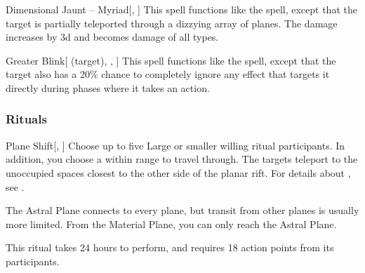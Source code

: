 \lowercase{\hypertarget{spell:Dimensional Jaunt -- Myriad}{}}\label{spell:Dimensional Jaunt -- Myriad}
\begin{apability}[\nth{6}]{\hypertarget{spell:Dimensional Jaunt -- Myriad}{Dimensional Jaunt -- Myriad}}[, ]
This spell functions like the  spell, except that the target is partially teleported through a dizzying array of planes.
The damage increases by \plus3d and becomes damage of all types.
\end{apability}
\vspace{0.25em}



\lowercase{\hypertarget{spell:Greater Blink}{}}\label{spell:Greater Blink}
\begin{attuneability}[\nth{7}]{\hypertarget{spell:Greater Blink}{Greater Blink}}[ (target), , ]
This spell functions like the  spell, except that the target also has a 20\% chance to completely ignore any effect that targets it directly during phases where it takes an action.
\end{attuneability}
\vspace{0.25em}



\subsubsection{Rituals}


\lowercase{\hypertarget{spell:Plane Shift}{}}\label{spell:Plane Shift}
\begin{apability}[\nth{3}]{\hypertarget{spell:Plane Shift}{Plane Shift}}[, ]
Choose up to five Large or smaller willing ritual participants.
In addition, you choose a  within \rngmed range to travel through.
The targets teleport to the unoccupied spaces closest to the other side of the planar rift.
For details about , see .

The Astral Plane connects to every plane, but transit from other planes is usually more limited.
From the Material Plane, you can only reach the Astral Plane.

This ritual takes 24 hours to perform, and requires 18 action points from its participants.
\end{apability}
\vspace{0.25em}



